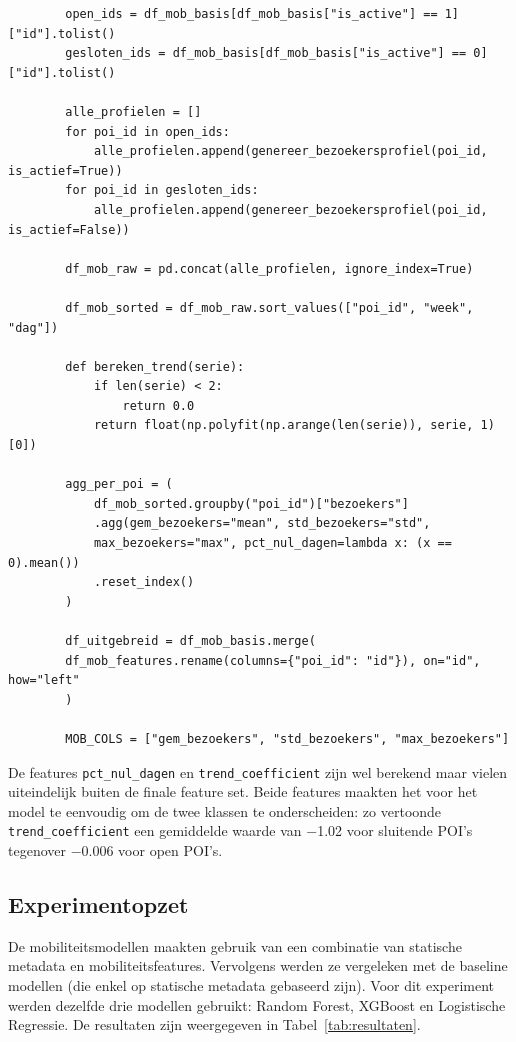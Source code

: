 \begin{listing}[H]
    \begin{verbatim}
        open_ids = df_mob_basis[df_mob_basis["is_active"] == 1]["id"].tolist()
        gesloten_ids = df_mob_basis[df_mob_basis["is_active"] == 0]["id"].tolist()
        
        alle_profielen = []
        for poi_id in open_ids:
            alle_profielen.append(genereer_bezoekersprofiel(poi_id, is_actief=True))
        for poi_id in gesloten_ids:
            alle_profielen.append(genereer_bezoekersprofiel(poi_id, is_actief=False))
        
        df_mob_raw = pd.concat(alle_profielen, ignore_index=True)
        
        df_mob_sorted = df_mob_raw.sort_values(["poi_id", "week", "dag"])
        
        def bereken_trend(serie):
            if len(serie) < 2:
                return 0.0
            return float(np.polyfit(np.arange(len(serie)), serie, 1)[0])
        
        agg_per_poi = (
            df_mob_sorted.groupby("poi_id")["bezoekers"]
            .agg(gem_bezoekers="mean", std_bezoekers="std",
            max_bezoekers="max", pct_nul_dagen=lambda x: (x == 0).mean())
            .reset_index()
        )
        
        df_uitgebreid = df_mob_basis.merge(
        df_mob_features.rename(columns={"poi_id": "id"}), on="id", how="left"
        )
        
        MOB_COLS = ["gem_bezoekers", "std_bezoekers", "max_bezoekers"]
    \end{verbatim}
    \caption[Generatie en aggregatie mobiliteitsdata]{Generatie van bezoekersprofielen per POI en aggregatie naar POI-niveau features.}
\end{listing}

De features \texttt{pct\_nul\_dagen} en \texttt{trend\_coefficient} zijn wel berekend maar vielen uiteindelijk buiten de finale feature set. Beide features maakten het voor het model te eenvoudig om de twee klassen te onderscheiden: zo vertoonde \texttt{trend\_coefficient} een gemiddelde waarde van $-$1.02 voor sluitende POI's tegenover $-$0.006 voor open POI's. 

\subsection{Experimentopzet}
De mobiliteitsmodellen maakten gebruik van een combinatie van statische metadata en mobiliteitsfeatures. Vervolgens werden ze vergeleken met de baseline modellen (die enkel op statische metadata gebaseerd zijn). Voor dit experiment werden dezelfde drie modellen gebruikt: Random Forest, XGBoost en Logistische Regressie. De resultaten zijn weergegeven in Tabel~\ref{tab:resultaten}.

